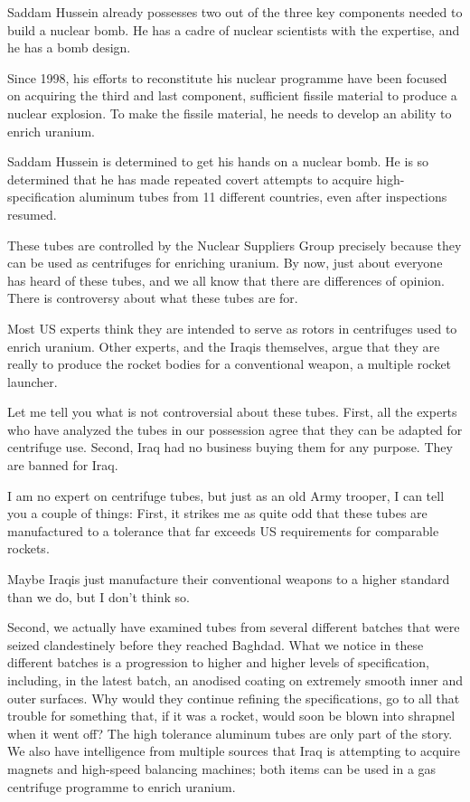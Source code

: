 \documentclass[10pt,a4paper]{article}
\begin{document}
Saddam Hussein already possesses two out of the three key components needed to build a nuclear bomb. He has a cadre of nuclear scientists with the expertise, and he has a bomb design.

Since 1998, his efforts to reconstitute his nuclear programme have been focused on acquiring the third and last component, sufficient fissile material to produce a nuclear explosion. To make the fissile material, he needs to develop an ability to enrich uranium.

Saddam Hussein is determined to get his hands on a nuclear bomb. He is so determined that he has made repeated covert attempts to acquire high-specification aluminum tubes from 11 different countries, even after inspections resumed.

These tubes are controlled by the Nuclear Suppliers Group precisely because they can be used as centrifuges for enriching uranium. By now, just about everyone has heard of these tubes, and we all know that there are differences of opinion. There is controversy about what these tubes are for.

Most US experts think they are intended to serve as rotors in centrifuges used to enrich uranium. Other experts, and the Iraqis themselves, argue that they are really to produce the rocket bodies for a conventional weapon, a multiple rocket launcher.

Let me tell you what is not controversial about these tubes. First, all the experts who have analyzed the tubes in our possession agree that they can be adapted for centrifuge use. Second, Iraq had no business buying them for any purpose. They are banned for Iraq.

I am no expert on centrifuge tubes, but just as an old Army trooper, I can tell you a couple of things: First, it strikes me as quite odd that these tubes are manufactured to a tolerance that far exceeds US requirements for comparable rockets.

Maybe Iraqis just manufacture their conventional weapons to a higher standard than we do, but I don't think so.

Second, we actually have examined tubes from several different batches that were seized clandestinely before they reached Baghdad. What we notice in these different batches is a progression to higher and higher levels of specification, including, in the latest batch, an anodised coating on extremely smooth inner and outer surfaces. Why would they continue refining the specifications, go to all that trouble for something that, if it was a rocket, would soon be blown into shrapnel when it went off? The high tolerance aluminum tubes are only part of the story. We also have intelligence from multiple sources that Iraq is attempting to acquire magnets and high-speed balancing machines; both items can be used in a gas centrifuge programme to enrich uranium.
\end{document}
